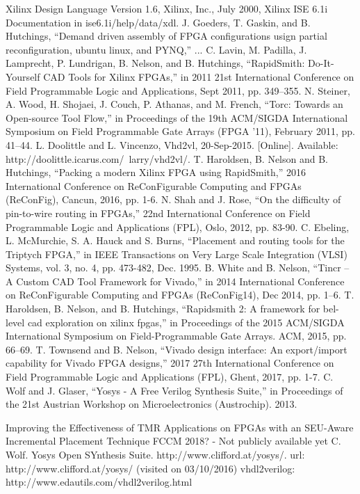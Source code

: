 \begin{thebibliography}{00}
	 Xilinx Design Language Version 1.6, Xilinx, Inc., July 2000, Xilinx ISE 6.1i Documentation in ise6.1i/help/data/xdl.
	 J. Goeders, T. Gaskin, and B. Hutchings, ``Demand driven assembly of FPGA configurations usign partial reconfiguration, ubuntu linux, and PYNQ,'' ...	
	 C. Lavin, M. Padilla, J. Lamprecht, P. Lundrigan, B. Nelson, and B. Hutchings, ``RapidSmith: Do-It-Yourself CAD Tools for Xilinx FPGAs,'' in 2011 21st International Conference on Field Programmable Logic and Applications, Sept 2011, pp. 349–355.
	 N. Steiner, A. Wood, H. Shojaei, J. Couch, P. Athanas, and M. French, ``Torc: Towards an Open-source Tool Flow,'' in Proceedings of the 19th ACM/SIGDA International Symposium on Field Programmable Gate Arrays (FPGA ’11), February 2011, pp. 41–44.
	 L. Doolittle and L. Vincenzo, Vhd2vl, 20-Sep-2015. [Online]. Available: http://doolittle.icarus.com/~larry/vhd2vl/.
	 T. Haroldsen, B. Nelson and B. Hutchings, ``Packing a modern Xilinx FPGA using RapidSmith,'' 2016 International Conference on ReConFigurable 
	Computing and FPGAs (ReConFig), Cancun, 2016, pp. 1-6.
	 N. Shah and J. Rose, ``On the difficulty of pin-to-wire routing in FPGAs,'' 22nd International Conference on Field Programmable Logic and Applications (FPL), Oslo, 2012, pp. 83-90.
	 C. Ebeling, L. McMurchie, S. A. Hauck and S. Burns, ``Placement and routing tools for the Triptych FPGA,'' in IEEE Transactions on Very Large Scale Integration (VLSI) Systems, vol. 3, no. 4, pp. 473-482, Dec. 1995.
	 B. White and B. Nelson, ``Tincr – A Custom CAD Tool Framework for Vivado,'' in 2014 International Conference on ReConFigurable Computing and FPGAs (ReConFig14), Dec 2014, pp. 1–6.
	 T. Haroldsen, B. Nelson, and B. Hutchings, ``Rapidsmith 2: A framework	for bel-level cad exploration on xilinx fpgas,'' in Proceedings of the 2015 ACM/SIGDA International Symposium on Field-Programmable Gate Arrays. ACM, 2015, pp. 66–69.
	 T. Townsend and B. Nelson, ``Vivado design interface: An export/import capability for Vivado FPGA designs,'' 2017 27th International Conference on Field Programmable Logic and Applications (FPL), Ghent, 2017, pp. 1-7.
	 C. Wolf and J. Glaser, ``Yosys - A Free Verilog Synthesis Suite,'' in Proceedings of the 21st Austrian Workshop on Microelectronics (Austrochip). 2013.
	
\end{thebibliography}

Improving the Effectiveness of TMR Applications on FPGAs with an SEU-Aware Incremental Placement Technique FCCM 2018? - Not publicly available yet
C.  Wolf. Yosys Open SYnthesis Suite. http://www.clifford.at/yosys/. url: http://www.clifford.at/yosys/ (visited on 03/10/2016)
vhdl2verilog: http://www.edautils.com/vhdl2verilog.html